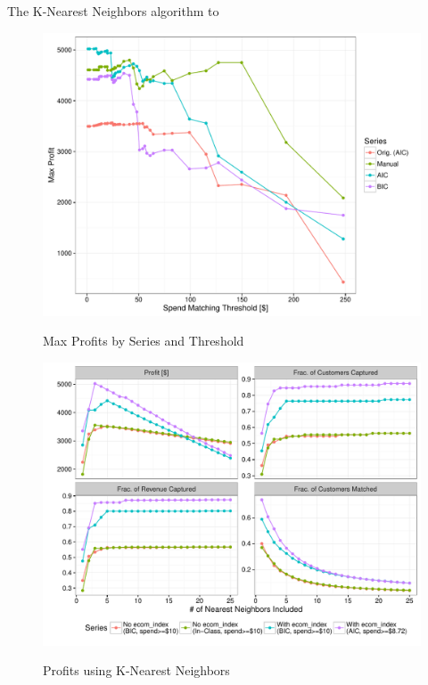 The  K-Nearest Neighbors algorithm to 





\begin{figure}[!htb]
  \centering
  \caption{Max Profits by Series and Threshold}
  \includegraphics[scale=.5]{threshold_max_profit.pdf}
  \label{fig:threshold_max_profit}
\end{figure}

\begin{figure}[!htb]
  \centering
  \caption{Profits using K-Nearest Neighbors}
  \includegraphics[scale=.75]{profits.pdf}
  \label{fig:profits}
\end{figure}
\clearpage

